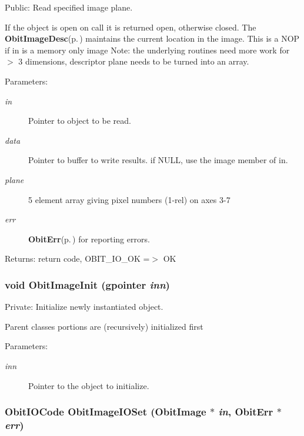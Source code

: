 Public: Read specified image plane. 

If the object is open on call it is returned open, otherwise closed. The {\bf Obit\-Image\-Desc}{\rm (p.\,\pageref{structObitImageDesc})} maintains the current location in the image. This is a NOP if in is a memory only image Note: the underlying routines need more work for $>$ 3 dimensions, descriptor plane needs to be turned into an array. \begin{Desc}
\item[Parameters:]
\begin{description}
\item[{\em in}]Pointer to object to be read. \item[{\em data}]Pointer to buffer to write results. if NULL, use the image member of in. \item[{\em plane}]5 element array giving pixel numbers (1-rel) on axes 3-7 \item[{\em err}]{\bf Obit\-Err}{\rm (p.\,\pageref{structObitErr})} for reporting errors. \end{description}
\end{Desc}
\begin{Desc}
\item[Returns:]return code, OBIT\_\-IO\_\-OK =$>$ OK \end{Desc}
\subsubsection{\setlength{\rightskip}{0pt plus 5cm}void Obit\-Image\-Init (gpointer {\em inn})}\label{ObitImage_8c_a3}


Private: Initialize newly instantiated object. 

Parent classes portions are (recursively) initialized first \begin{Desc}
\item[Parameters:]
\begin{description}
\item[{\em inn}]Pointer to the object to initialize. \end{description}
\end{Desc}
\subsubsection{\setlength{\rightskip}{0pt plus 5cm}Obit\-IOCode Obit\-Image\-IOSet ({\bf Obit\-Image} $\ast$ {\em in}, {\bf Obit\-Err} $\ast$ {\em err})}\label{ObitImage_8c_a31}


